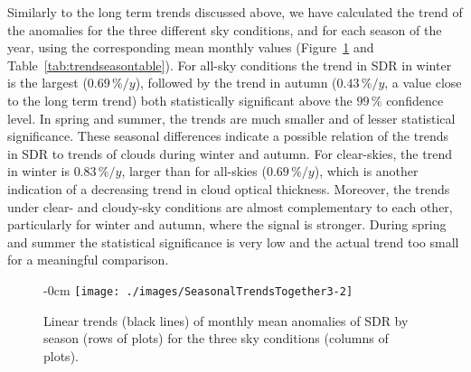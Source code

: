 \documentclass[applsci,article,submit,moreauthors,pdftex]{Definitions/mdpi}
\begin{document}
Similarly to the long term trends discussed above, we have calculated
the trend of the anomalies for the three different sky conditions, and
for each season of the year, using the corresponding mean monthly values
(Figure~\ref{fig:seasonalALL} and Table~\ref{tab:trendseasontable}). For
all-sky conditions the trend in SDR in winter is the largest
(\(0.69\,\%/y\)), followed by the trend in autumn (\(0.43\,\%/y\), a
value close to the long term trend) both statistically significant above
the \(99\,\%\) confidence level. In spring and summer, the trends are
much smaller and of lesser statistical significance. These seasonal
differences indicate a possible relation of the trends in SDR to trends
of clouds during winter and autumn. For clear-skies, the trend in winter
is \(0.83\,\%/y\), larger than for all-skies (\(0.69\,\%/y\)), which is
another indication of a decreasing trend in cloud optical thickness.
Moreover, the trends under clear- and cloudy-sky conditions are almost
complementary to each other, particularly for winter and autumn, where
the signal is stronger. During spring and summer the statistical
significance is very low and the actual trend too small for a meaningful
comparison.

\begin{figure}[h!]
    \begin{adjustwidth}{-\extralength}{0cm}
        {\centering 
            \texttt{[image: ./images/SeasonalTrendsTogether3-2]} 
        }
        \caption{Linear trends (black lines) of monthly mean anomalies of SDR by season (rows of plots) for the three sky conditions (columns of plots).}\label{fig:seasonalALL}
    \end{adjustwidth}
\end{figure}
\end{document}

